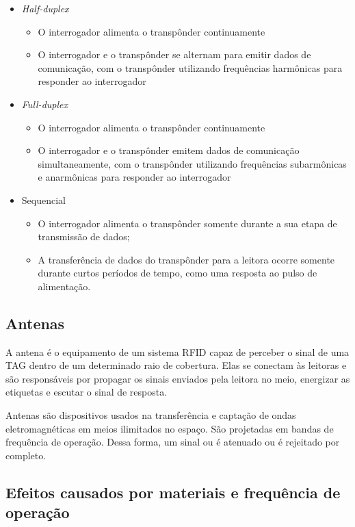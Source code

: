 \begin{itemize}
    \item \textit{Half-duplex}
    \begin{itemize}
        \item O interrogador alimenta o transpônder continuamente
        \item O interrogador e o transpônder se alternam para emitir dados de comunicação, com o transpônder utilizando frequências harmônicas para responder ao interrogador
    \end{itemize}
    \item \textit{Full-duplex}
    \begin{itemize}
        \item O interrogador alimenta o transpônder continuamente
        \item O interrogador e o transpônder emitem dados de comunicação simultaneamente, com o transpônder utilizando frequências subarmônicas e anarmônicas para responder ao interrogador
    \end{itemize}
    \item Sequencial
    \begin{itemize}
        \item O interrogador alimenta o transpônder somente durante a sua etapa de transmissão de dados;
        \item A transferência de dados do transpônder para a leitora ocorre somente durante curtos períodos de tempo, como uma resposta ao pulso de alimentação.
    \end{itemize}
\end{itemize}




\subsection{Antenas}

A antena é o equipamento de um sistema RFID capaz de perceber o sinal de uma TAG dentro de um determinado raio de cobertura. Elas se conectam às leitoras e são responsáveis por propagar os sinais enviados pela leitora no meio, energizar as etiquetas e escutar o sinal de resposta.

Antenas são dispositivos usados na transferência e captação de ondas eletromagnéticas em meios ilimitados no espaço. São projetadas em bandas de frequência de operação. Dessa forma, um sinal ou é atenuado ou é rejeitado por completo. \cite{antena}

\subsection{Efeitos causados por materiais e frequência de operação}


